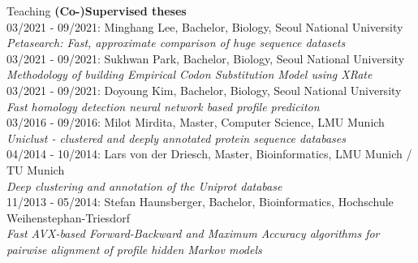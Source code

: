 \documentclass{resume} %
\begin{document}
\begin{rSection}{Teaching}
{\bf (Co-)Supervised theses}\vspace{1mm} 
\\[3mm]
03/2021 - 09/2021: Minghang Lee, Bachelor, Biology, Seoul National University\\
{\em Petasearch: Fast, approximate comparison of huge sequence datasets}
\\[3mm]
03/2021 - 09/2021: Sukhwan Park, Bachelor, Biology, Seoul National University\\
{\em Methodology  of  building  Empirical  Codon Substitution  Model  using  XRate}
\\[3mm]
03/2021 - 09/2021: Doyoung Kim, Bachelor, Biology, Seoul National University\\
{\em Fast homology detection neural network based profile prediciton}
\\[3mm]
03/2016 - 09/2016: Milot Mirdita, Master, Computer Science, LMU Munich\\
{\em Uniclust - clustered and deeply annotated protein sequence databases}
\\[3mm]
04/2014 - 10/2014: Lars von der Driesch, Master, Bioinformatics,  LMU Munich / TU Munich\\
{\em Deep clustering and annotation of the Uniprot database}
\\[3mm]
11/2013 - 05/2014: Stefan Haunsberger, Bachelor, Bioinformatics, Hochschule Weihenstephan-Triesdorf\\
{\em Fast AVX-based Forward-Backward and Maximum Accuracy algorithms for pairwise alignment of profile hidden Markov models}
\\[1.mm] 
\end{rSection}
\end{document}
